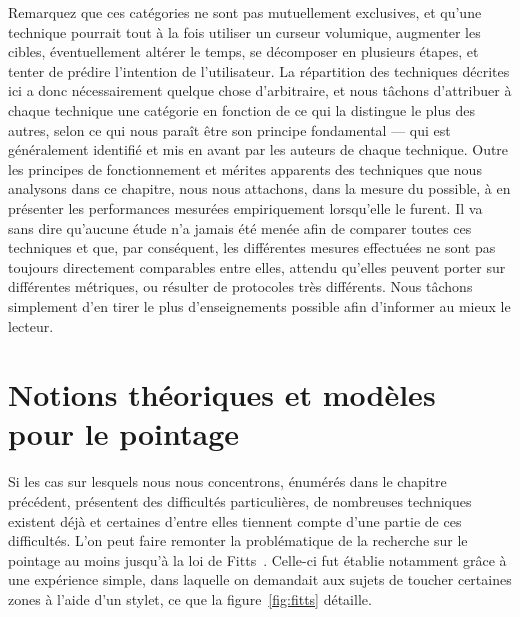 	Remarquez que ces catégories ne sont pas mutuellement exclusives, et qu'une technique pourrait tout à la fois utiliser un curseur volumique, augmenter les cibles, éventuellement altérer le temps, se décomposer en plusieurs étapes, et tenter de prédire l'intention de l'utilisateur. La répartition des techniques décrites ici a donc nécessairement quelque chose d'arbitraire, et nous tâchons d'attribuer à chaque technique une catégorie en fonction de ce qui la distingue le plus des autres, selon ce qui nous paraît être son principe fondamental --- qui est généralement identifié et mis en avant par les auteurs de chaque technique. Outre les principes de fonctionnement et mérites apparents des techniques que nous analysons dans ce chapitre, nous nous attachons, dans la mesure du possible, à en présenter les performances mesurées empiriquement lorsqu'elle le furent. Il va sans dire qu'aucune étude n'a jamais été menée afin de comparer toutes ces techniques et que, par conséquent, les différentes mesures effectuées ne sont pas toujours directement comparables entre elles, attendu qu'elles peuvent porter sur différentes métriques, ou résulter de protocoles très différents. Nous tâchons simplement d'en tirer le plus d'enseignements possible afin d'informer au mieux le lecteur.

\section{Notions théoriques et modèles pour le pointage}
	Si les cas sur lesquels nous nous concentrons, énumérés dans le chapitre précédent, présentent des difficultés particulières, de nombreuses techniques existent déjà et certaines d'entre elles tiennent compte d'une partie de ces difficultés. L'on peut faire remonter la problématique de la recherche sur le pointage au moins jusqu'à la loi de Fitts~\cite{fitts1954information}. Celle-ci fut établie notamment grâce à une expérience simple, dans laquelle on demandait aux sujets de toucher certaines zones à l'aide d'un stylet, ce que la figure~\ref{fig:fitts} détaille.
	
